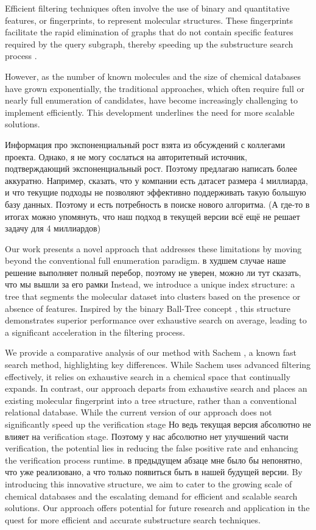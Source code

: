 Efficient filtering techniques often involve the use of binary and quantitative features, or fingerprints, to represent molecular 
structures. These fingerprints facilitate the rapid elimination of graphs that do not contain specific features required by the 
query subgraph, thereby speeding up the substructure search process \cite{bonchi2011, klein2014}.

However, as the number of known molecules and the size of chemical databases have grown exponentially, the traditional approaches, 
which often require full or nearly full enumeration of candidates, have become increasingly challenging to implement efficiently. 
This development underlines the need for more scalable solutions.

{\color{red} Информация про экспоненциальный рост взята из обсуждений с коллегами проекта. Однако, я не могу сослаться на авторитетный источник, подтверждающий экспоненциальный рост. Поэтому предлагаю написать более аккуратно. Например, сказать, что у компании есть датасет размера 4 миллиарда, и что текущие подходы не позволяют эффективно поддерживать такую большую базу данных. Поэтому и есть потребность в поиске нового алгоритма. (А где-то в итогах можно упомянуть, что наш подход в текущей версии всё ещё не решает задачу для 4 миллиардов) }

Our work presents a novel approach that addresses these limitations by moving beyond the conventional full enumeration paradigm. 
{\color{red} в худшем случае наше решение выполняет полный перебор, поэтому не уверен, можно ли тут сказать, что мы вышли за его рамки} 
Instead, we introduce a unique index structure: a tree that segments the molecular dataset into clusters based on the presence or 
absence of features. Inspired by the binary Ball-Tree concept \cite{omohundro1989, clarkson1994}, this structure demonstrates 
superior performance over exhaustive search on average, leading to a significant acceleration in the filtering process.

We provide a comparative analysis of our method with Sachem {\color{red} \cite{Kratochvil2018}}, a known fast search method, highlighting key differences. While Sachem 
uses advanced filtering effectively, it relies on exhaustive search in a chemical space that continually expands. In contrast, 
our approach departs from exhaustive search and places an existing molecular fingerprint into a tree structure, rather than a 
conventional relational database. While the current version of our approach does not significantly speed up the verification 
stage
{\color{red} Но ведь текущая версия абсолютно не влияет на verification stage. Поэтому у нас абсолютно нет улучшений части verification}, the potential lies in reducing the false positive rate and enhancing the verification process runtime.
{\color{red} в предыдущем абзаце мне было бы непонятно, что уже реализовано, а что только появиться быть в нашей будущей версии. }
By introducing this innovative structure, we aim to cater to the growing scale of chemical databases and the escalating demand 
for efficient and scalable search solutions. Our approach offers potential for future research and application in the quest 
for more efficient and accurate substructure search techniques.

